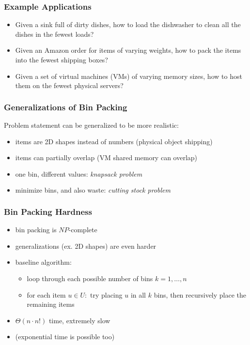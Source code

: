 \documentclass[10pt,aspectratio=169]{beamer}
\begin{document}
\begin{frame} \frametitle{Example Applications}
  \begin{itemize}
    \item Given a sink full of dirty dishes, how to load the dishwasher to clean all the dishes in the fewest loads?
    \item Given an Amazon order for items of varying weights, how to pack the items into the fewest shipping boxes?
    \item Given a set of virtual machines (VMs) of varying memory sizes, how to host them on the fewest physical servers?
  \end{itemize}
\end{frame}

\begin{frame} \frametitle{Generalizations of Bin Packing}
  Problem statement can be generalized to be more realistic:
  \begin{itemize}
    \item items are 2D shapes instead of numbers (physical object shipping)
    \item items can partially overlap (VM shared memory can overlap)
    \item one bin, different values: \emph{knapsack problem}
    \item minimize bins, and also waste: \emph{cutting stock problem}
  \end{itemize}
\end{frame}

\begin{frame} \frametitle{Bin Packing Hardness}
  \begin{itemize}
    \item bin packing is $NP$-complete
    \item generalizations (ex. 2D shapes) are even harder
    \item baseline algorithm:
      \begin{itemize}
        \item loop through each possible number of bins $k=1, \ldots, n$
        \item for each item $u \in U:$ try placing $u$ in all $k$ bins, then recursively place the remaining items
      \end{itemize}
    \item $\Theta(n \cdot n!)$ time, extremely slow
    \item (exponential time is possible too)
  \end{itemize}
\end{frame}
\end{document}

